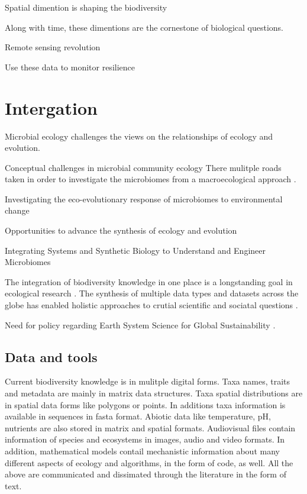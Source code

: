 Spatial dimention is shaping the biodiversity

Along with time, these dimentions are the cornestone of 
biological questions. 


Remote sensing revolution

Use these data to monitor resilience \parencite{Lenton2022resilience}

\section{Intergation}
\label{sec:crete-integration}

Microbial ecology challenges the views on the relationships of ecology and evolution.

Conceptual challenges in microbial community ecology \parencite{prosser2020Conceptual}
There mulitple roads taken in order to investigate the microbiomes from a macroecological
approach \parencite{Mascarenhas2020}.

Investigating the eco-evolutionary response of microbiomes to environmental change \parencite{martiny2023Investigating}

Opportunities to advance the synthesis of ecology and evolution \parencite{loreau2023Opportunities}

Integrating Systems and Synthetic Biology to Understand and Engineer Microbiomes \parencite{Leggieri2021}

The integration of biodiversity knowledge in one place is a longstanding
goal in ecological research \parencite{Walter_2012}. The synthesis of multiple
data types and datasets across the globe has enabled 
holistic approaches to crutial scientific and sociatal questions \parencite{heberling_j_mason_data_2021}.

Need for policy regarding Earth System Science for Global
Sustainability \parencite{reid2010earth}.

\subsection{Data and tools}
\label{sec:data-tools}

Current biodiversity knowledge is in mulitple digital forms. 
Taxa names, traits and metadata are mainly in matrix data
structures. Taxa spatial distributions are in spatial data
forms like polygons or points. In additions taxa information
is available in sequences in fasta format. Abiotic data like 
temperature, pH, nutrients are also stored in matrix
and spatial formats. Audiovisual files contain information
of species and ecosystems in images, audio and video formats.
In addition, mathematical models contail mechanistic information
about many different aspects of ecology and algorithms, in the 
form of code, as well. All the above are communicated and dissimated through the
literature in the form of text.

